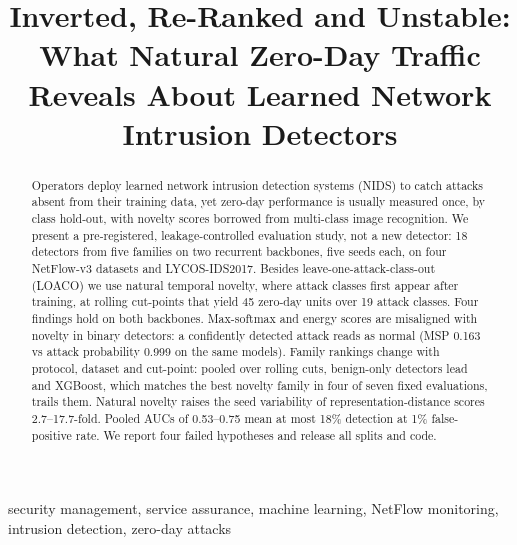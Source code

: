 \documentclass[conference]{IEEEtran}
\begin{document}
\title{Inverted, Re-Ranked and Unstable: What Natural Zero-Day Traffic Reveals About Learned Network Intrusion Detectors}

\author{
}

\maketitle

\begin{abstract}
Operators deploy learned network intrusion detection systems (NIDS) to catch attacks absent from their training data, yet zero-day performance is usually measured once, by class hold-out, with novelty scores borrowed from multi-class image recognition. We present a pre-registered, leakage-controlled evaluation study, not a new detector: 18 detectors from five families on two recurrent backbones, five seeds each, on four NetFlow-v3 datasets and LYCOS-IDS2017. Besides leave-one-attack-class-out (LOACO) we use natural temporal novelty, where attack classes first appear after training, at rolling cut-points that yield 45 zero-day units over 19 attack classes. Four findings hold on both backbones. Max-softmax and energy scores are misaligned with novelty in binary detectors: a confidently detected attack reads as normal (MSP 0.163 vs attack probability 0.999 on the same models). Family rankings change with protocol, dataset and cut-point: pooled over rolling cuts, benign-only detectors lead and XGBoost, which matches the best novelty family in four of seven fixed evaluations, trails them. Natural novelty raises the seed variability of representation-distance scores 2.7--17.7-fold. Pooled AUCs of 0.53--0.75 mean at most 18\% detection at 1\% false-positive rate. We report four failed hypotheses and release all splits and code.
\end{abstract}

\begin{IEEEkeywords}
security management, service assurance, machine learning, NetFlow monitoring, intrusion detection, zero-day attacks
\end{IEEEkeywords}
\end{document}
